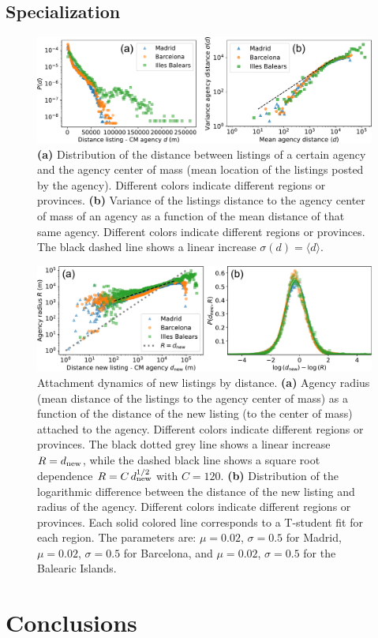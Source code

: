 \subsection{Specialization}

\begin{figure}
    \label{fig:distance_panel}
    \centering
    \includegraphics[width =\textwidth]{Figs/Idealista_dynamics/distance_panel.pdf}
	\caption[Distance correlations.]{\textbf{(a)} Distribution of the distance between listings of a certain agency and the agency center of mass (mean location of the listings posted by the agency). Different colors indicate different regions or provinces. \textbf{(b)} Variance of the listings distance to the agency center of mass of an agency as a function of the mean distance of that same agency. Different colors indicate different regions or provinces. The black dashed line shows a linear increase $\sigma(d) = \langle d \rangle$. }
\end{figure}

\begin{figure}
    \label{fig:distance_attach}
    \centering
    \includegraphics[width =\textwidth]{Figs/Idealista_dynamics/distance_attach.pdf}
	\caption[Attachment dynamics of new listings by distance.]{ Attachment dynamics of new listings by distance. \textbf{(a)} Agency radius (mean distance of the listings to the agency center of mass) as a function of the distance of the new listing (to the center of mass) attached to the agency. Different colors indicate different regions or provinces. The black dotted grey line shows a linear increase $R = d_{\rm new}$, while the dashed black line shows a square root dependence $R = C \, d_{\rm new}^{1/2}$ with $C = 120$. \textbf{(b)} Distribution of the logarithmic difference between the distance of the new listing and radius of the agency. Different colors indicate different regions or provinces. Each solid colored line corresponds to a T-student fit for each region. The parameters are: $\mu = 0.02$, $\sigma = 0.5$ for Madrid, $\mu = 0.02$, $\sigma = 0.5$ for Barcelona, and $\mu = 0.02$, $\sigma = 0.5$ for the Balearic Islands.}
\end{figure}

\section{Conclusions}












